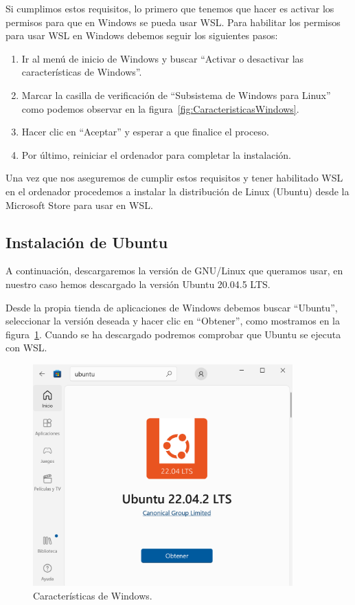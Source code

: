 \documentclass[a4paper, 12pt]{book}
\begin{document}
Si cumplimos estos requisitos, lo primero que tenemos que hacer es activar los permisos para que en Windows se pueda usar WSL.
Para habilitar los permisos para usar WSL en Windows debemos seguir los siguientes pasos:
\begin{enumerate}
  \item Ir al menú de inicio de Windows y buscar ``Activar o desactivar las características de Windows''.
  \item Marcar la casilla de verificación de ``Subsistema de Windows para Linux'' como podemos observar en la figura~\ref{fig:CaracteristicasWindows}.
  \item Hacer clic en ``Aceptar'' y esperar a que finalice el proceso. 
  \item Por último, reiniciar el ordenador para completar la instalación.
\end{enumerate} 
  

Una vez que nos aseguremos de cumplir estos requisitos y tener habilitado WSL en el ordenador procedemos a instalar la distribución de Linux (Ubuntu) desde la Microsoft Store para usar en WSL. 

\subsection{Instalación de Ubuntu} %
\label{sec:instalación de ubuntu}

A continuación, descargaremos la versión de GNU/Linux que queramos usar, en nuestro caso hemos descargado la versión Ubuntu 20.04.5 LTS.


Desde la propia tienda de aplicaciones de Windows debemos buscar ``Ubuntu'', seleccionar la versión deseada y hacer clic en ``Obtener'', como mostramos en la figura~\ref{fig:ubuntu}.
Cuando se ha descargado podremos comprobar que Ubuntu se ejecuta con WSL.

\begin{figure}
  \centering
  \includegraphics[width=10cm, keepaspectratio]{img/Ubuntu.PNG}
  \caption{Características de Windows.}\label{fig:ubuntu}
\end{figure}
\end{document}
